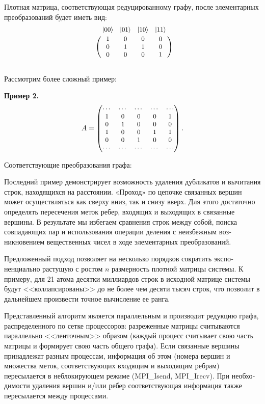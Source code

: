 Плотная матрица, соответствующая редуцированному графу, после эле­ментарных преобразований будет иметь вид:
\[
{\small
	\bordermatrix{
		& |00\ra & |01\ra & |10\ra & |11\ra \cr
		& 1 & 0 & 0 & 0 \cr
		& 0 & 1 & 1 & 0 \cr
		& 0 & 0 & 0 & 1
	}
}
\]
\
\\[12pt]
\noindent Рассмотрим более сложный пример:

\noindent\textbf{Пример 2.}
\[
{\small
A =
\begin{pmatrix}
	\cdots & \cdots & \cdots & \cdots & \cdots\\
	1 & 0 & 0 & 0 & 1 \cr
	0 & 1 & 0 & 0 & 0 \cr
	1 & 0 & 0 & 1 & 1 \cr
	0 & 0 & 1 & 0 & 0 \cr
	\cdots & \cdots & \cdots & \cdots & \cdots
\end{pmatrix}.
}
\]

\noindent Соответствующие преобразования графа:
\begin{figure}[h]
	\noindent{}
	\label{figCurves}
\end{figure}

\clearpage
Последний пример демонстрирует возможность удаления дубликатов и вычитания строк, находящихся на расстоянии. «Проход» по цепочке связанных вершин может осуществляться как сверху вниз, так и снизу вверх. Для это­го достаточно определять пересечения меток ребер, входящих и выходящих в связанные вершины. В результате мы избегаем сравнения строк между собой, поиска совпадающих пар и использования операции деления с неизбежным воз­никновением вещественных чисел в ходе элементарных преобразований.

Предложенный подход позволяет на несколько порядков сократить экспо­ненциально растущую с ростом $n$ размерность плотной матрицы системы. К примеру, для 21 атома десятки миллиардов строк в исходной матрице системы будут <<коллапсированы>> до не более чем десяти тысяч строк, что позволит в дальнейшем произвести точное вычисление ее ранга.

Представленный алгоритм является параллельным и производит редукцию графа, распределенного по сетке процессоров: разреженные матрицы считываются параллельно <<ленточным>> образом (каждый процесс считывает свою часть матрицы и формирует свою часть общего графа). Если связанные вершины принадлежат разным процессам, информация об этом (номера вер­шин и множества меток, соответствующих входящим и выходящим ребрам) пересылается в неблокирующем режиме (MPI\_Isend, MPI\_Irecv). При необхо­димости удаления вершин и/или ребер соответствующая информация также пересылается между процессами.

